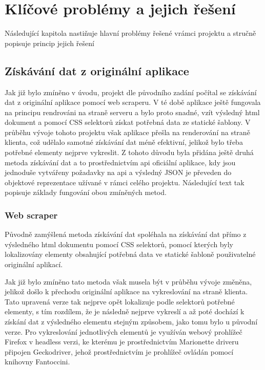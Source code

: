 \documentclass[12pt]{article}
\begin{document}
\newpage

\section{Klíčové problémy a jejich řešení}
Následující kapitola nastiňuje hlavní problémy řešené vrámci projektu a stručně popisuje princip jejich řešení

\subsection{Získávání dat z originální aplikace}
Jak již bylo zmíněno v úvodu, projekt dle původního zadání počítal se získávání dat z originální aplikace pomocí web scraperu. V té době aplikace ještě fungovala na principu rendrováni na straně serveru a bylo proto snadné, vzít výsledný html dokument a pomocí CSS selektorů získat potřebná data ze statické šablony. V průběhu vývoje tohoto projektu však aplikace přešla na renderování na straně klienta, což udělalo samotné získávání dat méně efektivní, jelikož bylo třeba potřebné elementy nejprve vykreslit. Z tohoto důvodu byla přidána ještě druhá metoda získávání dat a to prostřednictvím api oficiální aplikace, kdy jsou jednoduše vytvářeny požadavky na api a výsledný JSON je převeden do objektové reprezentace užívané v rámci celého projektu. Následující text tak popisuje základy fungování obou zmíněných metod.

\subsubsection{Web scraper}
Původně zamýšlená metoda získávání dat spoléhala na získávání dat přímo z výsledného html dokumentu pomocí CSS selektorů\cite{selector}, pomocí kterých byly lokalizovány elementy obsahující potřebná data ve statické šabloně použivatelné originální aplikací.

Jak již bylo zmíněno tato metoda však musela být v průběhu vývoje změněna, jelikož došlo k přechodu originální aplikace na vykreslování na straně klienta. Tato upravená verze tak nejprve opět lokalizuje podle selektorů potřebné elementy, s tím rozdílem, že je následně nejprve vykreslí a až poté dochází k získání dat z výsledného elementu stejným způsobem\cite{scraping}, jako tomu bylo u původní verze. Pro vykreslování jednotlivých elementů je využíván webový prohlížeč Firefox v headless verzi, ke kterému je prostřednictvím Marionette driveru\cite{marionette} připojen Geckodriver\cite{gecko}, jehož prostřednictvím je prohlížeč ovládán pomocí knihovny Fantoccini\cite{fantoccini}.
\end{document}
